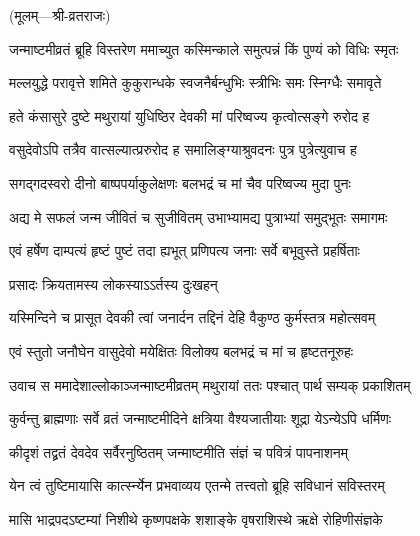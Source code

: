 \begingroup
\setlength{\parindent}{0pt}
\centerline{\small{(मूलम्—श्री-व्रतराजः)}}


\twolineshloka
{जन्माष्टमीव्रतं ब्रूहि विस्तरेण ममाच्युत}
{कस्मिन्काले समुत्पन्नं किं पुण्यं को विधिः स्मृतः}%

\twolineshloka
{मल्लयुद्धे परावृत्ते शमिते कुकुरान्धके}
{स्वजनैर्बन्धुभिः स्त्रीभिः समः स्निग्धैः समावृते}%

\twolineshloka
{हते कंसासुरे दुष्टे मथुरायां युधिष्ठिर}
{देवकी मां परिष्वज्य कृत्वोत्सङ्गे रुरोद ह}%

\twolineshloka
{वसुदेवोऽपि तत्रैव वात्सल्यात्प्ररुरोद ह}
{समालिङ्ग्याश्रुवदनः पुत्र पुत्रेत्युवाच ह}%

\twolineshloka
{सगद्गदस्वरो दीनो बाष्पपर्याकुलेक्षणः}
{बलभद्रं च मां चैव परिष्वज्य मुदा पुनः}%

\twolineshloka
{अद्य मे सफलं जन्म जीवितं च सुजीवितम्}
{उभाभ्यामद्य पुत्राभ्यां समुद्भूतः समागमः}%

\twolineshloka
{एवं हर्षेण दाम्पत्यं हृष्टं पुष्टं तदा ह्यभूत्}
{प्रणिपत्य जनाः सर्वे बभूवुस्ते प्रहर्षिताः}%

\onelineshloka
{प्रसादः क्रियतामस्य लोकस्याऽऽर्तस्य दुःखहन्}%

\twolineshloka
{यस्मिन्दिने च प्रासूत देवकी त्वां जनार्दन}
{तद्दिनं देहि वैकुण्ठ कुर्मस्तत्र महोत्सवम्}%

\twolineshloka
{एवं स्तुतो जनौघेन वासुदेवो मयेक्षितः}
{विलोक्य बलभद्रं च मां च हृष्टतनूरुहः}%

\twolineshloka
{उवाच स ममादेशाल्लोकाञ्जन्माष्टमीव्रतम्}
{मथुरायां ततः पश्चात् पार्थ सम्यक् प्रकाशितम्}%

\twolineshloka
{कुर्वन्तु ब्राह्मणाः सर्वे व्रतं जन्माष्टमीदिने}
{क्षत्रिया वैश्यजातीयाः शूद्रा येऽन्येऽपि धर्मिणः}%

\twolineshloka
{कीदृशं तद्व्रतं देवदेव सर्वैरनुष्ठितम्}
{जन्माष्टमीति संज्ञं च पवित्रं पापनाशनम्}%

\twolineshloka
{येन त्वं तुष्टिमायासि कार्त्स्न्येन प्रभवाव्यय}
{एतन्मे तत्त्वतो ब्रूहि सविधानं सविस्तरम्}%


\twolineshloka
{मासि भाद्रपदऽष्टम्यां निशीथे कृष्णपक्षके}
{शशाङ्के वृषराशिस्थे ऋक्षे रोहिणीसंज्ञके}%

